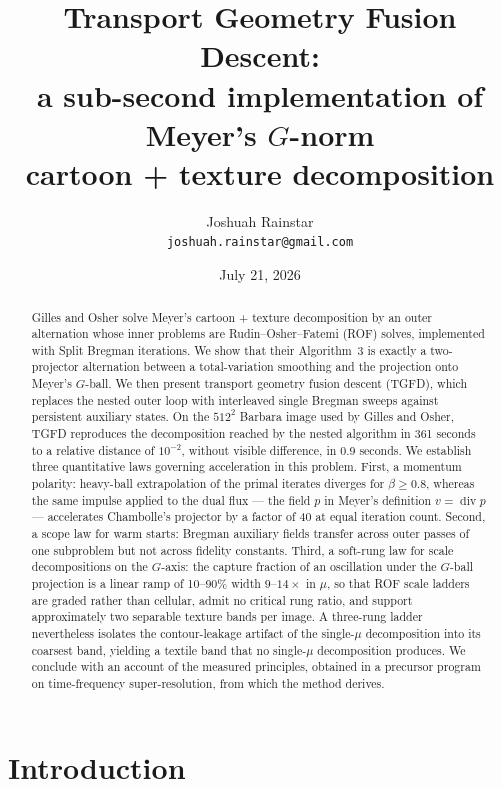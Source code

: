\documentclass[11pt]{article}
\title{Transport Geometry Fusion Descent:\\
a sub-second implementation of Meyer's $G$-norm\\
cartoon + texture decomposition}
\author{Joshuah Rainstar\\
\texttt{joshuah.rainstar@gmail.com}}
\date{July 21, 2026}
\theoremstyle{definition}
\newcommand{\dv}{\operatorname{div}}
\begin{document}
\maketitle

\begin{abstract}
Gilles and Osher solve Meyer's cartoon + texture decomposition by an outer
alternation whose inner problems are Rudin--Osher--Fatemi (ROF) solves,
implemented with Split Bregman iterations. We show that their Algorithm~3 is
exactly a two-projector alternation between a total-variation smoothing and
the projection onto Meyer's $G$-ball. We then present transport geometry
fusion descent (TGFD), which replaces the nested outer loop with interleaved
single Bregman sweeps against persistent auxiliary states. On the $512^2$
Barbara image used by Gilles and Osher, TGFD reproduces the decomposition
reached by the nested algorithm in 361 seconds to a relative distance of
$10^{-2}$, without visible difference, in 0.9 seconds. We establish three
quantitative laws governing acceleration in this problem. First, a momentum
polarity: heavy-ball extrapolation of the primal iterates diverges for
$\beta\ge0.8$, whereas the same impulse applied to the dual flux --- the
field $p$ in Meyer's definition $v=\dv p$ --- accelerates Chambolle's
projector by a factor of 40 at equal iteration count. Second, a scope law
for warm starts: Bregman auxiliary fields transfer across outer passes of
one subproblem but not across fidelity constants. Third, a soft-rung law
for scale decompositions on the $G$-axis: the capture fraction of an
oscillation under the $G$-ball projection is a linear ramp of 10--90\%
width $9$--$14\times$ in $\mu$, so that ROF scale ladders are graded rather
than cellular, admit no critical rung ratio, and support approximately two
separable texture bands per image. A three-rung ladder nevertheless
isolates the contour-leakage artifact of the single-$\mu$ decomposition
into its coarsest band, yielding a textile band that no single-$\mu$
decomposition produces. We conclude with an account of the measured
principles, obtained in a precursor program on time-frequency
super-resolution, from which the method derives.
\end{abstract}

\section{Introduction}
\end{document}
